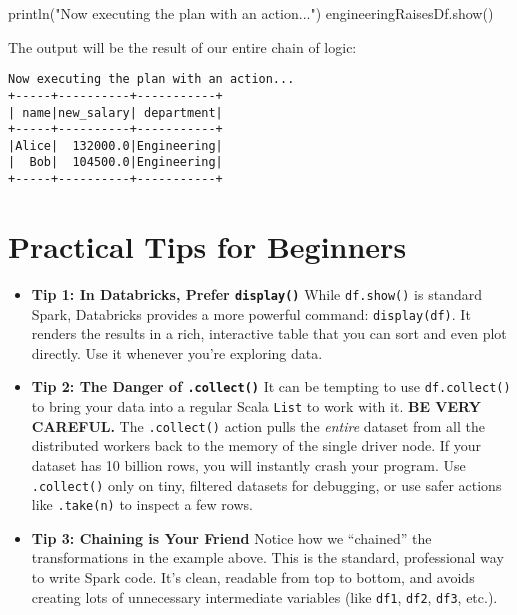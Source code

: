 \documentclass[
  letterpaper,
  DIV=11,
  numbers=noendperiod]{scrreprt}
\newenvironment{Shaded}{\begin{snugshade}}{\end{snugshade}}
\newcommand{\FunctionTok}[1]{\textcolor[rgb]{0.28,0.35,0.67}{#1}}
\newcommand{\NormalTok}[1]{\textcolor[rgb]{0.00,0.23,0.31}{#1}}
\newcommand{\OperatorTok}[1]{\textcolor[rgb]{0.37,0.37,0.37}{#1}}
\newcommand{\StringTok}[1]{\textcolor[rgb]{0.13,0.47,0.30}{#1}}
\begin{document}
\begin{Shaded}
\begin{Highlighting}[]
\FunctionTok{println}\OperatorTok{(}\StringTok{"Now executing the plan with an action..."}\OperatorTok{)}
\NormalTok{engineeringRaisesDf}\OperatorTok{.}\FunctionTok{show}\OperatorTok{()}
\end{Highlighting}
\end{Shaded}

The output will be the result of our entire chain of logic:

\begin{verbatim}
Now executing the plan with an action...
+-----+----------+-----------+
| name|new_salary| department|
+-----+----------+-----------+
|Alice|  132000.0|Engineering|
|  Bob|  104500.0|Engineering|
+-----+----------+-----------+
\end{verbatim}

\section{Practical Tips for
Beginners}\label{practical-tips-for-beginners}

\begin{itemize}
\item
  \textbf{Tip 1: In Databricks, Prefer \texttt{display()}} While
  \texttt{df.show()} is standard Spark, Databricks provides a more
  powerful command: \texttt{display(df)}. It renders the results in a
  rich, interactive table that you can sort and even plot directly. Use
  it whenever you're exploring data.
\item
  \textbf{Tip 2: The Danger of \texttt{.collect()}} It can be tempting
  to use \texttt{df.collect()} to bring your data into a regular Scala
  \texttt{List} to work with it. \textbf{BE VERY CAREFUL.} The
  \texttt{.collect()} action pulls the \emph{entire} dataset from all
  the distributed workers back to the memory of the single driver node.
  If your dataset has 10 billion rows, you will instantly crash your
  program. Use \texttt{.collect()} only on tiny, filtered datasets for
  debugging, or use safer actions like \texttt{.take(n)} to inspect a
  few rows.
\item
  \textbf{Tip 3: Chaining is Your Friend} Notice how we ``chained'' the
  transformations in the example above. This is the standard,
  professional way to write Spark code. It's clean, readable from top to
  bottom, and avoids creating lots of unnecessary intermediate variables
  (like \texttt{df1}, \texttt{df2}, \texttt{df3}, etc.).
\end{itemize}
\end{document}
